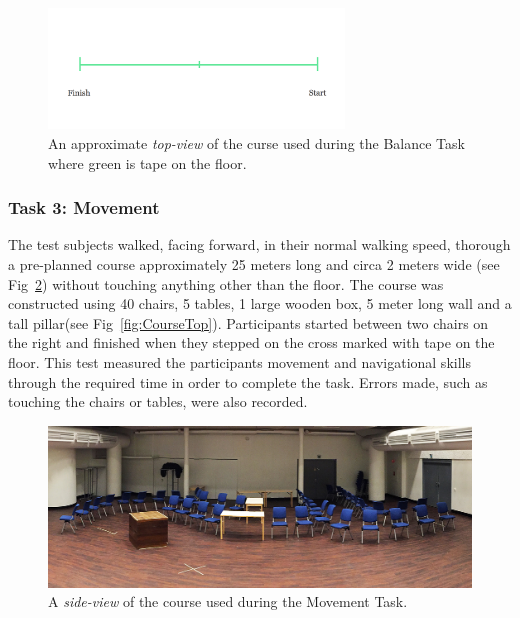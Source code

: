 \documentclass[runningheads,a4paper,oribibl]{llncs}
\begin{document}
\begin{figure}
   \centering
   \includegraphics[width=0.7\textwidth]{ExternalMaterial/BalanceTask}
   \caption{An approximate \emph{top-view} of the curse used during the Balance Task where green is tape on the floor.} \label{fig:BalanceTask}
\end{figure}

\subsubsection{Task 3: Movement}

The test subjects walked, facing forward, in their normal walking speed, thorough a pre-planned course approximately 25 meters long and circa 2 meters wide (see Fig~\ref{fig:Course}) without touching anything other than the floor. The course was constructed using 40 chairs, 5 tables, 1 large wooden box, 5 meter long wall and a tall pillar(see Fig~\ref{fig:CourseTop}). Participants started between two chairs on the right and finished when they stepped on the cross marked with tape on the floor. This test measured the participants movement and navigational skills through the required time in order to complete the task. Errors made, such as touching the chairs or tables, were also recorded.

\begin{figure}
   \centering
   \includegraphics[width=\textwidth]{ExternalMaterial/Course2}
   \caption{A \emph{side-view} of the course used during the Movement Task.} \label{fig:Course}
\end{figure}
\end{document}

